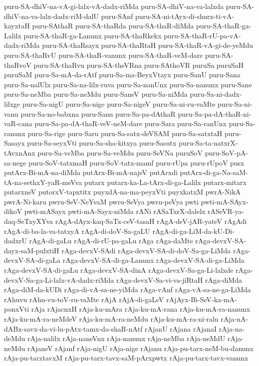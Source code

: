 {puru-SA-dhiV-na-vA-gi-lalx-vA-dadx-riMda
puru-SA-dhiV-na-va-lalxda
puru-SA-dhiV-na-va-lalx-dadx-riM-dalU
puru-SAnf
puru-SA-ni-tAyx-di-shurx-ti-vA-kayxtaH
puru-SAthaR
puru-SA-thaRda
puru-SA-thaR-diMda
puru-SA-thaR-ga-Lalilx
puru-SA-thaR-ga-Lanunx
puru-SA-thaRkekx
puru-SA-thaR-rU-pa-vA-dadx-riMda
puru-SA-thaRsayx
puru-SA-thaRtaH
puru-SA-thaR-vA-gi-de-yeMdu
puru-SA-thaRvU
puru-SA-thaR-vanunx
puru-SA-thaR-veM-dare
puru-SA-thaRvoV
puru-SA-thaRvu
puru-SA-theVRna
puru-SAthoVR
puruSa
puruSaH
puruSaM
puru-Sa-mA-da-rAtf
puru-Sa-ma-BeyxVtayx
puru-SanU
puru-Sana
puru-Sa-nalUlx
puru-Sa-na-lilx-ruva
puru-Sa-nanUnx
puru-Sa-nanunx
puru-Sane
puru-Sa-neMba
puru-Sa-neMdu
puru-SaneV
puru-Sa-niMda
puru-Sa-ni-dadx-lilxge
puru-Sa-nigU
puru-Sa-nige
puru-Sa-nigeV
puru-Sa-ni-ru-vaMte
puru-Sa-ni-vanu
puru-Sa-no-babxna
puru-Sanu
puru-Sa-pa-dAthaR
puru-Sa-pa-dA-thaR-ni-vaR-cana
puru-Sa-pa-dA-thaR-veV-neM-dare
puru-Sara
puru-Sa-ranUnx
puru-Sa-ranunx
puru-Sa-rige
puru-Saru
puru-Sa-satx-deVSAM
puru-Sa-satxtaH
puru-Sasayx
puru-Sa-seyxVti
puru-Sa-sha-kitxya
puru-Sasutx
puru-Sa-ta-natxrX-tAvxnAnx
puru-Sa-veMba
puru-Sa-veMdu
puru-SeVNa
puruSoV
puru-SoV-pA-sa-nege
puru-SoV-tatxmaH
puru-SoV-tatx-mamf
puru-rUpa
puru-rUpoV
pusx
putArx-Bi-mA-na-diMda
putArx-Bi-mA-najeV
putArxdi
putArx-di-ga-Na-saM-tA-na-sethxY-yaR-meVva
putarx
putarx-ka-La-tArx-di-ga-Lalilx
putarx-mitarx
putarxneV
putorxV-tapxtitx
puyxdA-na-ma-peyxVti
puyxkatxM
pwrA-NikA
pwrA-Ni-karu
pwru-SeV-NeYvaM
pwru-SeVya
pwru-peVya
pwti
pwti-mA-SAyx-dikoV
pwti-mASayx
pwti-mA-Sayx-niMda
rANi
rASaTxrX-dalelx
rASeVR-ya-daq-SeTxyXYva
rAgA-dAyx-kaq-SaTx-ceV-tasaH
rAgA-deV-jAR-yateV
rAgAdi
rAgA-di-ba-la-va-tatxyA
rAgA-di-doV-Sa-gaLU
rAgA-di-ga-LiM-da-kU-Di-dadxrU
rAgA-di-gaLu
rAgA-di-rU-pa-gaLu
rAga
rAga-daMte
rAga-devxV-SA-dayx-saM-pulxtiH
rAga-devxV-SAdi
rAga-devxV-SA-di-doV-Sa-ga-LiMda
rAga-devxV-SA-di-gaLa
rAga-devxV-SA-di-ga-Lanunx
rAga-devxV-SA-di-ga-LiMda
rAga-devxV-SA-di-gaLu
rAga-devxV-SA-dinA
rAga-devxV-Sa-ga-Li-lalxde
rAga-devxV-Sa-ga-Li-lalx-vA-dadx-riMda
rAga-devxV-Sa-vi-va-jiRtaH
rAga-diMda
rAga-diM-da-kUDi
rAga-di-vA-sa-ne-yiMda
rAga-vAnf
rAga-vA-sa-ne-ga-LiMda
rAhuvu
rAhu-vu-toV-ru-vaMte
rAjA
rAjA-di-gaLeV
rAjAyx-Bi-SeV-ka-mA-ponxVti
rAja
rAjacnxH
rAja-ku-mAra
rAja-ku-mA-rana
rAja-ku-mA-ra-nanunx
rAja-ku-mA-ra-neMdeV
rAja-ku-mA-ra-neMdu
rAja-ku-mA-ra-ni-ralu
rAja-nA-dABx-savx-da-vi-lu-pAtx-tamx-da-shaR-nAtf
rAjanU
rAjana
rAjanaI
rAja-na-deMdu
rAja-nalilx
rAja-naneVnx
rAja-nanunx
rAja-neMba
rAja-neMdU
rAja-neMdu
rAjaneV
rAjanf
rAja-nigU
rAja-nige
rAjanu
rAja-pu-tarx-neM-bu-danunx
rAja-pu-tarxtavxM
rAja-pu-tarx-tavx-saM-pArxpwtx
rAja-pu-tarx-tavx-vanunx
}
